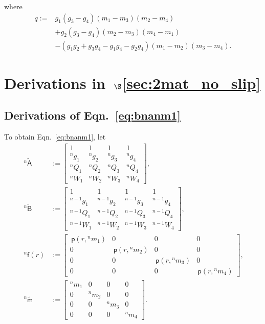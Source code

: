 \documentclass[preprint,12pt,times,draft]{elsarticle}
\numberwithin{equation}{section}
\renewcommand{\u}[1]{\boldsymbol{#1}}
\newcommand{\usf}[1]{\u{\mathsf #1}}
\newcommand{\pr}[1]{\left( #1 \right)}
\newcommand{\p}{\,\mathsf{p}}
\renewcommand{\>}{$\Rightarrow$}
\begin{document}
where
\begin{equation}
	\begin{aligned}
	q := & g_1(g_3 - g_4)(m_1 - m_3)(m_2 - m_4) \\
	 	& + g_2(g_3 - g_4)(m_2 - m_3)(m_4 - m_1) \\
	 	& - (g_1 g_2 + g_3 g_4 - g_1 g_4 - g_2 g_4)(m_1 - m_2)(m_3 - m_4).
	\end{aligned}
\end{equation}

\section{Derivations in~$\S$\ref{sec:2mat_no_slip}}
\label{Appen:derivations}
\subsection{Derivations of Eqn.~\eqref{eq:bnanm1}}
\label{Appen:Eqn315}
To obtain Eqn.~\eqref{eq:bnanm1}, let
\begin{subequations}
\begin{align}
	~^{n}\tilde{\usf{A}}
	& :=
	\begin{bmatrix}
		1 & 1 & 1 & 1 \\
		{}^{n}\!{g_{1}} & {}^{n}\!{g_{2}} & {}^{n}\!{g_{3}} & {}^{n}\!{g_{4}} \\
		{}^{n}\!{Q_{1}} & {}^{n}\!{Q_{2}} & {}^{n}\!{Q_{3}} & {}^{n}\!{Q_{4}} \\
		{}^{n}\!{W_{1}} & {}^{n}\!{W_{2}} & {}^{n}\!{W_{3}} & {}^{n}\!{W_{4}}
	\end{bmatrix}, \\
	~^{n}\tilde{\usf{B}}
	& :=
	\begin{bmatrix}
		1 & 1 & 1 & 1 \\
		{}^{n-1}\!{g_{1}} & {}^{n-1}\!{g_{2}} & {}^{n-1}\!{g_{3}} & {}^{n-1}\!{g_{4}} \\
		{}^{n-1}\!{Q_{1}} & {}^{n-1}\!{Q_{2}} & {}^{n-1}\!{Q_{3}} & {}^{n-1}\!{Q_{4}} \\
		{}^{n-1}\!{W_{1}} & {}^{n-1}\!{W_{2}} & {}^{n-1}\!{W_{3}} & {}^{n-1}\!{W_{4}}
	\end{bmatrix}, \\
  \label{eq:deff}
	~^{n}\usf{f}(r)
	& :=
	\begin{bmatrix}
		\p\pr{r,{}^{n}\!{m_{1}}} & 0 & 0 & 0 \\
		0 & \p\pr{r,{}^{n}\!{m_{2}}} & 0 & 0 \\
		0 & 0 & \p\pr{r,{}^{n}\!{m_{3}}} & 0 \\
		0 & 0 & 0 & \p\pr{r,{}^{n}\!{m_{4}}}
	\end{bmatrix}, \\
	~^{n}\tilde{\usf{m}}
	& :=
	\begin{bmatrix}
		{}^{n}\!{m_{1}} & 0 & 0 & 0 \\
		0 & {}^{n}\!{m_{2}} & 0 & 0 \\
		0 & 0 & {}^{n}\!{m_{3}} & 0 \\
		0 & 0 & 0 & {}^{n}\!{m_{4}}
	\end{bmatrix}.
	\end{align}
	\label{eq:C1}
\end{subequations}
\end{document}
